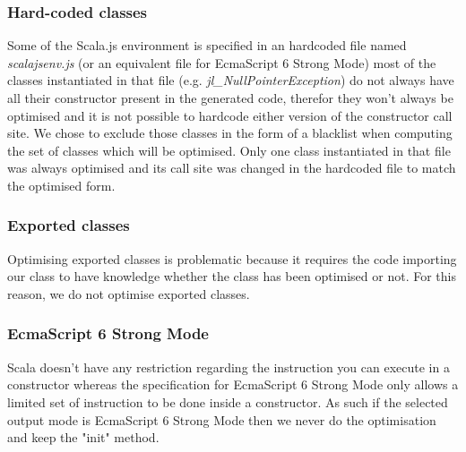 \subsubsection{Hard-coded classes}
Some of the Scala.js environment is specified in an hardcoded file named
\emph{scalajsenv.js} (or an equivalent file for EcmaScript 6 Strong Mode) most
of the classes instantiated in that file (e.g. \emph{jl\_NullPointerException})
do not always have all their constructor present in the generated code,
therefor they won't always be optimised and it is not possible to hardcode
either version of the constructor call site. We chose to exclude those classes
in the form of a blacklist when computing the set of classes which will be
optimised. Only one class instantiated in that file was always optimised and
its call site was changed in the hardcoded file to match the optimised form.
\subsubsection{Exported classes}
Optimising exported classes is problematic because it requires the code
importing our class to have knowledge whether the class has been optimised or
not. For this reason, we do not optimise exported classes.

\subsubsection{EcmaScript 6 Strong Mode}
Scala doesn't have any restriction regarding the instruction you can execute in
a constructor whereas the specification for EcmaScript 6 Strong Mode only
allows a limited set of instruction to be done inside a constructor. As such if
the selected output mode is EcmaScript 6 Strong Mode then we never do the
optimisation and keep the "init" method.

